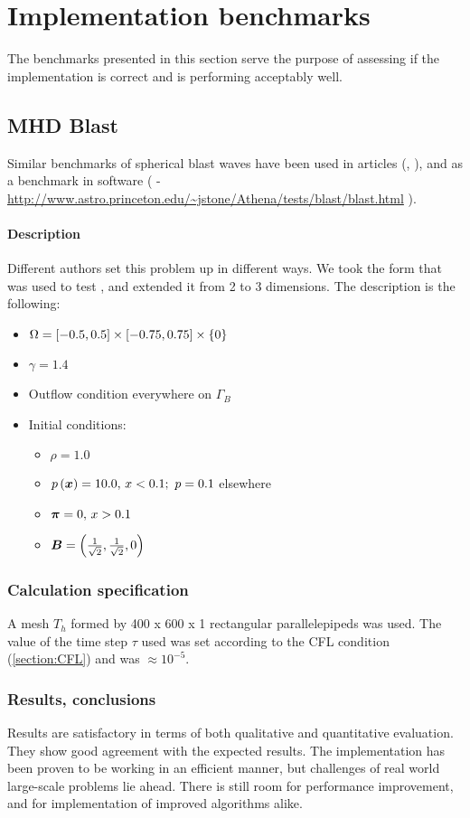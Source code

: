 \section{Implementation benchmarks}
The benchmarks presented in this section serve the purpose of assessing if the implementation is correct and is performing acceptably well.

\subsection{MHD Blast}
Similar benchmarks of spherical blast waves have been used in articles (\cite{blast1}, \cite{blast2}), and as a benchmark in software (\cite{athena} - \url{http://www.astro.princeton.edu/~jstone/Athena/tests/blast/blast.html} ).


\paragraph{Description}
Different authors set this problem up in different ways. We took the form that was used to test \cite{athena}, and extended it from 2 to 3 dimensions. The description is the following:
\begin{itemize}
    \item $\Omega = \left[-0.5, 0.5\right] \times \left[-0.75, 0.75\right] \times \{0\}$
    \item $\gamma = 1.4$
    \item Outflow condition everywhere on $\Gamma_B$
    \item Initial conditions:
    \begin{itemize}
        \item $\rho = 1.0$
        \item $p\left(\mbox{\boldmath $x$}\right) = 10.0,\,x<0.1;\ p = 0.1$ elsewhere
        \item $\mbox{\boldmath $\pi$} = 0,\,x>0.1$
        \item $\mbox{\boldmath $B$} = \left(\frac{1}{\sqrt{2}}, \frac{1}{\sqrt{2}}, 0\right)$
    \end{itemize}
   \end{itemize}

\subsubsection{Calculation specification}
A mesh $T_h$ formed by 400 x 600 x 1 rectangular parallelepipeds was used.
The value of the time step $\tau$ used was set according to the CFL condition (\ref{section:CFL}) and was $\approx 10^{-5}$.

\subsubsection{Results, conclusions}
Results are satisfactory in terms of both qualitative and quantitative evaluation. They show good agreement with the expected results. The implementation has been proven to be working in an efficient manner, but challenges of real world large-scale problems lie ahead. There is still room for performance improvement, and for implementation of improved algorithms alike.